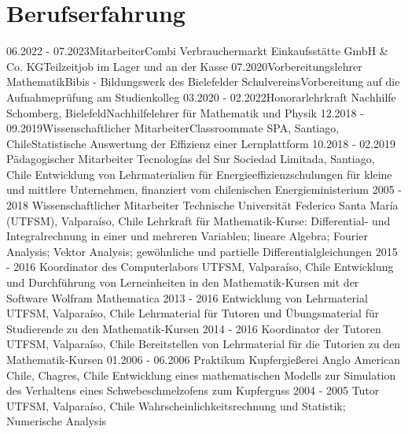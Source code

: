 \documentclass[a4paper]{cv-class}
\let\oldincludegraphics\includegraphics
\renewcommand\includegraphics[2][]{%
  \oldincludegraphics[#1,max width=10cm,max height=\textheight]{#2}
}
\begin{document}
\begin{aside}
%   
%   
\end{aside}

\vspace{0.5cm}

\section{Berufserfahrung}
\begin{entrylist}
\entry
{06.2022 - 07.2023}{Mitarbeiter}{Combi Verbrauchermarkt
Einkaufsstätte GmbH \& Co. KG}{Teilzeitjob im Lager und an der Kasse}
\entry
{07.2020}{Vorbereitungslehrer Mathematik}{Bibis - Bildungswerk des
Bielefelder Schulvereins}{Vorbereitung auf die Aufnahmeprüfung
am Studienkolleg}
\entry
{03.2020 - 02.2022}{Honorarlehrkraft} {Nachhilfe Schomberg, Bielefeld}{Nachhilfelehrer für Mathematik und Physik}
\entry
{12.2018 - 09.2019\!}{Wissenschaftlicher Mitarbeiter}{Classroommate SPA, Santiago, Chile}{Statistische Auswertung der Effizienz einer Lernplattform}
\entry
    {10.2018 - 02.2019}
    {Pädagogischer Mitarbeiter}
    {Tecnologías del Sur Sociedad Limitada, Santiago, Chile}
    {Entwicklung von Lehrmaterialien für Energieeffizienzschulungen für kleine und mittlere Unternehmen, finanziert vom chilenischen Energieministerium}
\entry
    {2005 - 2018}
    {Wissenschaftlicher Mitarbeiter}
    {Technische Universität Federico Santa María (UTFSM), Valpara\'iso, Chile}
    {Lehrkraft für Mathematik-Kurse: Differential- und Integralrechnung in einer und mehreren Variablen; lineare Algebra; Fourier Analysis; Vektor Analysis; gewöhnliche und partielle Differentialgleichungen}
 \entry
    {2015 - 2016}
    {Koordinator des Computerlabors}
    {UTFSM, Valparaíso, Chile}
    {Entwicklung und Durchführung von Lerneinheiten in den Mathematik-Kursen  mit der Software Wolfram Mathematica}
  \entry
    {2013 - 2016}
    {Entwicklung von Lehrmaterial}
    {UTFSM, Valparaíso, Chile}
    {Lehrmaterial für Tutoren und Übungsmaterial für Studierende zu den Mathematik-Kursen}
  \entry
    {2014 - 2016}
    {Koordinator der Tutoren}
    {UTFSM, Valparaíso, Chile}
    {Bereitstellen von Lehrmaterial für die Tutorien zu den Mathematik-Kursen}
  \entry
    {01.2006 - 06.2006}
    {Praktikum}
    {Kupfergie{\ss}erei Anglo American Chile, Chagres, Chile}
    {Entwicklung eines mathematischen Modells zur Simulation des Verhaltens eines Schwebeschmelzofens zum Kupferguss}
\entry
   {2004 - 2005}
   {Tutor}
   {UTFSM, Valpara\'iso, Chile}
   {Wahrscheinlichkeitsrechnung und Statistik; Numerische Analysis}

 \end{entrylist}%
\end{document}
